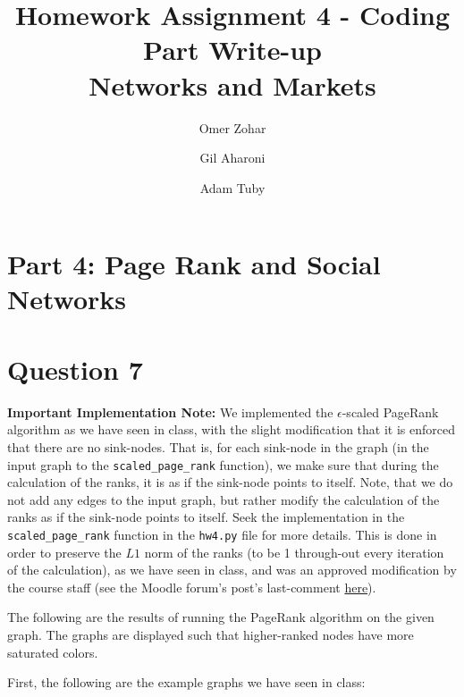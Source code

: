 \documentclass{article}
\title{
    Homework Assignment 4 - Coding Part Write-up\\
    Networks and Markets
}
\author{
    Omer Zohar
    \and
    Gil Aharoni
    \and
    Adam Tuby
}
\begin{document}
\maketitle

\section*{Part 4: Page Rank and Social Networks}
\setcounter{section}{0}

\section{Question 7}
\textbf{Important Implementation Note:} We implemented the $\epsilon$-scaled PageRank algorithm as we have seen in class, with the slight modification that it is enforced that there are no sink-nodes. That is, for each sink-node in the graph (in the input graph to the \texttt{scaled\_page\_rank} function), we make sure that during the calculation of the ranks, it is as if the sink-node points to itself. Note, that we do not add any edges to the input graph, but rather modify the calculation of the ranks as if the sink-node points to itself. Seek the implementation in the \texttt{scaled\_page\_rank} function in the \texttt{hw4.py} file for more details. This is done in order to preserve the $L1$ norm of the ranks (to be 1 through-out every iteration of the calculation), as we have seen in class, and was an approved modification by the course staff (see the Moodle forum's post's last-comment \href{https://moodle.tau.ac.il/mod/forum/discuss.php?d=104715\#p161936}{here}).

The following are the results of running the PageRank algorithm on the given graph. The graphs are displayed such that higher-ranked nodes have more saturated colors.

\noindent
First, the following are the example graphs we have seen in class:
\end{document}
